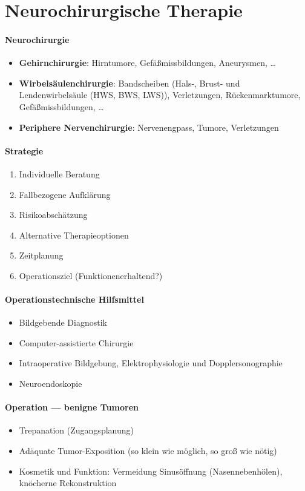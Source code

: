 \section*{Neurochirurgische Therapie}

\paragraph{Neurochirurgie}
\begin{itemize}
  \item \textbf{Gehirnchirurgie}: Hirntumore, Gefäßmissbildungen, Aneurysmen, \dots
  \item \textbf{Wirbelsäulenchirurgie}: Bandscheiben (Hals-, Brust- und Lendenwirbelsäule (HWS, BWS, LWS)), Verletzungen, Rückenmarktumore, Gefäßmissbildungen, \dots
  \item \textbf{Periphere Nervenchirurgie}: Nervenengpass, Tumore, Verletzungen
\end{itemize}

\paragraph{Strategie}
\begin{enumerate}
  \item Individuelle Beratung
  \item Fallbezogene Aufklärung
  \item Risikoabschätzung
  \item Alternative Therapieoptionen
  \item Zeitplanung
  \item Operationsziel (Funktionenerhaltend?)
\end{enumerate}

\paragraph{Operationstechnische Hilfsmittel}
\begin{itemize}
  \item Bildgebende Diagnostik
  \item Computer-assistierte Chirurgie
  \item Intraoperative Bildgebung, Elektrophysiologie und Dopplersonographie
  \item Neuroendoskopie
\end{itemize}

\paragraph{Operation --- benigne Tumoren}
\begin{itemize}
  \item Trepanation (Zugangsplanung)
  \item Adäquate Tumor-Exposition (so klein wie möglich, so groß wie nötig)
  \item Kosmetik und Funktion: Vermeidung Sinusöffnung (Nasennebenhölen), knöcherne Rekonstruktion
\end{itemize}

